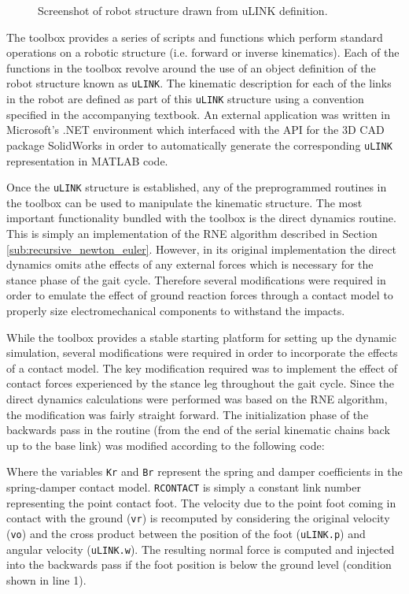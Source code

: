 \begin{figure}[!ht]
\begin{center}
	\end{center}
  \caption{Screenshot of robot structure drawn from uLINK definition.}
\end{figure}

The toolbox provides a series of scripts and functions which perform standard operations on a robotic structure (i.e. forward or inverse kinematics). Each of the functions in the toolbox revolve around the use of an object definition of the robot structure known as \texttt{uLINK}. The kinematic description for each of the links in the robot are defined as part of this \texttt{uLINK} structure using a convention specified in the accompanying textbook. An external application was written in Microsoft's .NET environment which interfaced with the API for the 3D CAD package SolidWorks \cite{sw:solidworks} in order to automatically generate the corresponding \texttt{uLINK} representation in MATLAB code. 

Once the \texttt{uLINK} structure is established, any of the preprogrammed routines in the toolbox can be used to manipulate the kinematic structure. The most important functionality bundled with the toolbox is the direct dynamics routine. This is simply an implementation of the RNE algorithm described in Section \ref{sub:recursive_newton_euler}. However, in its original implementation the direct dynamics omits athe effects of any external forces which is necessary for the stance phase of the gait cycle. Therefore several modifications were required in order to emulate the effect of ground reaction forces through a contact model to properly size electromechanical components to withstand the impacts. 

While the toolbox provides a stable starting platform for setting up the dynamic simulation, several modifications were required in order to incorporate the effects of a contact model. The key modification required was to implement the effect of contact forces experienced by the stance leg throughout the gait cycle. Since the direct dynamics calculations were performed was based on the RNE algorithm, the modification was fairly straight forward. The initialization phase of the backwards pass in the routine (from the end of the serial kinematic chains back up to the base link) was modified according to the following code: 



Where the variables \texttt{Kr} and \texttt{Br} represent the spring and damper coefficients in the spring-damper contact model. \texttt{RCONTACT} is simply a constant link number representing the point contact foot. The velocity due to the point foot coming in contact with the ground (\texttt{vr}) is recomputed by considering the original velocity (\texttt{vo}) and the cross product between the position of the foot (\texttt{uLINK.p}) and angular velocity (\texttt{uLINK.w}). The resulting normal force is computed and injected into the backwards pass if the foot position is below the ground level (condition shown in line 1). 

